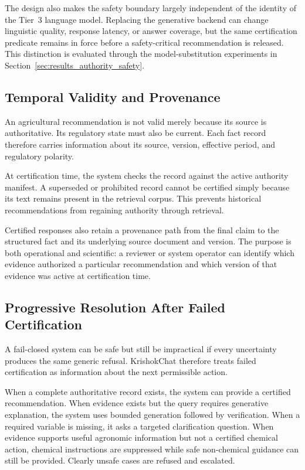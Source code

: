 \documentclass[a4paper,fleqn]{cas-dc}
\begin{document}
The design also makes the safety boundary largely independent of the identity of the Tier~3 language model. Replacing the generative backend can change linguistic quality, response latency, or answer coverage, but the same certification predicate remains in force before a safety-critical recommendation is released. This distinction is evaluated through the model-substitution experiments in Section~\ref{sec:results_authority_safety}.

\subsection{Temporal Validity and Provenance}

An agricultural recommendation is not valid merely because its source is authoritative. Its regulatory state must also be current. Each fact record therefore carries information about its source, version, effective period, and regulatory polarity.

At certification time, the system checks the record against the active authority manifest. A superseded or prohibited record cannot be certified simply because its text remains present in the retrieval corpus. This prevents historical recommendations from regaining authority through retrieval.

Certified responses also retain a provenance path from the final claim to the structured fact and its underlying source document and version. The purpose is both operational and scientific: a reviewer or system operator can identify which evidence authorized a particular recommendation and which version of that evidence was active at certification time.

\subsection{Progressive Resolution After Failed Certification}
\label{sec:progressive_answerability}

A fail-closed system can be safe but still be impractical if every uncertainty produces the same generic refusal. KrishokChat therefore treats failed certification as information about the next permissible action.

When a complete authoritative record exists, the system can provide a certified recommendation. When evidence exists but the query requires generative explanation, the system uses bounded generation followed by verification. When a required variable is missing, it asks a targeted clarification question. When evidence supports useful agronomic information but not a certified chemical action, chemical instructions are suppressed while safe non-chemical guidance can still be provided. Clearly unsafe cases are refused and escalated.
\end{document}
